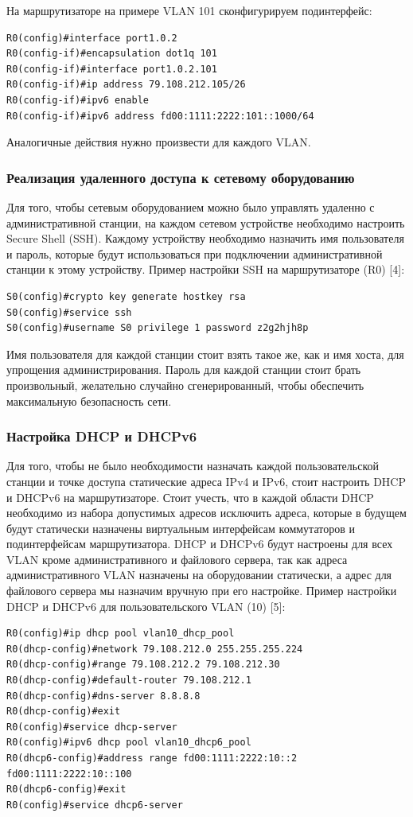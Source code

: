     На маршрутизаторе на примере VLAN 101 сконфигурируем подинтерфейс:
\begin{lstlisting}
R0(config)#interface port1.0.2
R0(config-if)#encapsulation dot1q 101
R0(config-if)#interface port1.0.2.101
R0(config-if)#ip address 79.108.212.105/26
R0(config-if)#ipv6 enable
R0(config-if)#ipv6 address fd00:1111:2222:101::1000/64
\end{lstlisting}
    Аналогичные действия нужно произвести для каждого VLAN.

    \subsubsection{Реализация удаленного доступа к сетевому оборудованию}
    Для того, чтобы сетевым оборудованием можно было управлять удаленно с административной станции,
    на каждом сетевом устройстве необходимо настроить Secure Shell (SSH).
    Каждому устройству необходимо назначить имя пользователя и пароль,
    которые будут использоваться при подключении административной станции к этому устройству.
    Пример настройки SSH на маршрутизаторе (R0) [4]:
\begin{lstlisting}
S0(config)#crypto key generate hostkey rsa
S0(config)#service ssh
S0(config)#username S0 privilege 1 password z2g2hjh8p
\end{lstlisting}
    Имя пользователя для каждой станции стоит взять такое же, как и имя хоста, для упрощения администрирования.
    Пароль для каждой станции стоит брать произвольный, желательно случайно сгенерированный,
    чтобы обеспечить максимальную безопасность сети.

    \subsubsection{Настройка DHCP и DHCPv6}
    Для того, чтобы не было необходимости назначать каждой пользовательской станции и точке доступа статические адреса IPv4 и IPv6,
    стоит настроить DHCP и DHCPv6 на маршрутизаторе.
    Стоит учесть, что в каждой области DHCP необходимо из набора допустимых адресов исключить адреса,
    которые в будущем будут статически назначены виртуальным интерфейсам коммутаторов и подинтерфейсам маршрутизатора.
    DHCP и DHCPv6 будут настроены для всех VLAN кроме административного и файлового сервера,
    так как адреса административного VLAN назначены на оборудовании статически,
    а адрес для файлового сервера мы назначим вручную при его настройке.
    Пример настройки DHCP и DHCPv6 для пользовательского VLAN (10) [5]:
\begin{lstlisting}[xleftmargin=1]
R0(config)#ip dhcp pool vlan10_dhcp_pool
R0(dhcp-config)#network 79.108.212.0 255.255.255.224
R0(dhcp-config)#range 79.108.212.2 79.108.212.30
R0(dhcp-config)#default-router 79.108.212.1
R0(dhcp-config)#dns-server 8.8.8.8
R0(dhcp-config)#exit
R0(config)#service dhcp-server
R0(config)#ipv6 dhcp pool vlan10_dhcp6_pool
R0(dhcp6-config)#address range fd00:1111:2222:10::2 fd00:1111:2222:10::100
R0(dhcp6-config)#exit
R0(config)#service dhcp6-server
\end{lstlisting}

